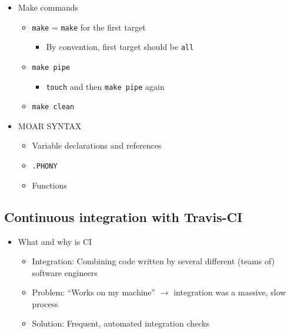 \documentclass[
]{article}
\providecommand{\tightlist}{%
  \setlength{\itemsep}{0pt}\setlength{\parskip}{0pt}}
\begin{document}
\begin{itemize}
\tightlist
\item
  Make commands

  \begin{itemize}
  \tightlist
  \item
    \texttt{make} = \texttt{make} for the first target

    \begin{itemize}
    \tightlist
    \item
      By convention, first target should be \texttt{all}
    \end{itemize}
  \item
    \texttt{make\ pipe}

    \begin{itemize}
    \tightlist
    \item
      \texttt{touch} and then \texttt{make\ pipe} again
    \end{itemize}
  \item
    \texttt{make\ clean}
  \end{itemize}
\item
  MOAR SYNTAX

  \begin{itemize}
  \tightlist
  \item
    Variable declarations and references
  \item
    \texttt{.PHONY}
  \item
    Functions
  \end{itemize}
\end{itemize}

\hypertarget{continuous-integration-with-travis-ci}{%
\subsection{Continuous integration with Travis-CI}\label{continuous-integration-with-travis-ci}}

\begin{itemize}
\tightlist
\item
  What and why is CI

  \begin{itemize}
  \tightlist
  \item
    Integration: Combining code written by several different (teams of) software engineers
  \item
    Problem: ``Works on my machine'' \(\to\) integration was a massive, slow process
  \item
    Solution: Frequent, automated integration checks
  \end{itemize}
\end{itemize}
\end{document}
